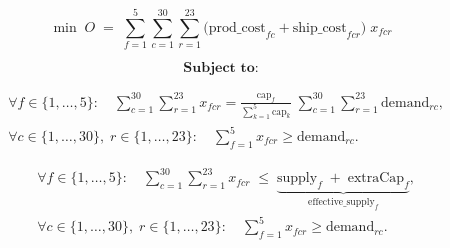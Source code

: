 \documentclass{article}
\begin{document}
\[
\min\;O
\;=\;
\sum_{f=1}^{5}\sum_{c=1}^{30}\sum_{r=1}^{23}
\bigl(\mathrm{prod\_cost}_{f c} + \mathrm{ship\_cost}_{f c r}\bigr)\;x_{f c r}
\]

\[
\textbf{Subject to:}
\]

\medskip

\noindent{}
\[
\begin{aligned}
&\forall f\in\{1,\dots,5\}:\quad
  \sum_{c=1}^{30}\sum_{r=1}^{23} x_{f c r}
  = \frac{\,\mathrm{cap}_{f}\,}{\sum_{k=1}^{5}\mathrm{cap}_{k}}\;
    \sum_{c=1}^{30}\sum_{r=1}^{23} \mathrm{demand}_{r c},\\[6pt]
&\forall c\in\{1,\dots,30\},\;r\in\{1,\dots,23\}:\quad
  \sum_{f=1}^{5} x_{f c r}
  \ge \mathrm{demand}_{r c}.
\end{aligned}
\]

\medskip

\noindent{}
\[
\begin{aligned}
&\forall f\in\{1,\dots,5\}:\quad
  \sum_{c=1}^{30}\sum_{r=1}^{23} x_{f c r}
  \;\le\;
  \underbrace{\mathrm{supply}_{f} \;+\;\mathrm{extraCap}_{f}}_{\displaystyle \mathrm{effective\_supply}_{f}},\\[6pt]
&\forall c\in\{1,\dots,30\},\;r\in\{1,\dots,23\}:\quad
  \sum_{f=1}^{5} x_{f c r}
  \ge \mathrm{demand}_{r c}.
\end{aligned}
\]

\medskip
\end{document}
